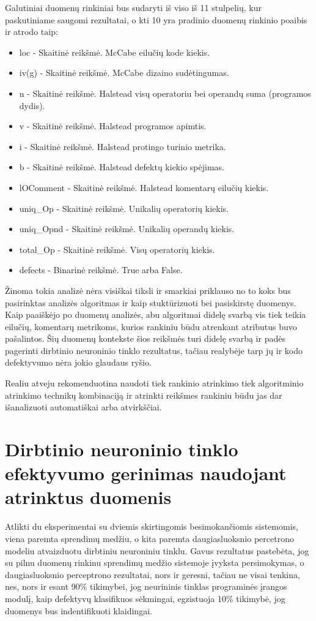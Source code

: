 \documentclass{VUMIFPSbakalaurinis}
\begin{document}
Galutiniai duomenų rinkiniai bus sudaryti iš viso iš 11 stulpelių, kur paskutiniame saugomi rezultatai, o kti 10 yra pradinio duomenų rinkinio poaibis ir atrodo taip:
\begin{itemize} 
\item[] loc - Skaitinė reikšmė. McCabe eilučių kode kiekis.
\item[] iv(g) - Skaitinė reikšmė. McCabe dizaino sudėtingumas.
\item[] n - Skaitinė reikšmė. Halstead visų operatoriu bei operandų suma (programos dydis).
\item[] v - Skaitinė reikšmė. Halstead programos apimtis.
\item[] i - Skaitinė reikšmė. Halstead protingo turinio metrika.
\item[] b - Skaitinė reikšmė. Halstead defektų kiekio spėjimas.
\item[] lOComment - Skaitinė reikšmė. Halstead komentarų eilučių kiekis.
\item[] uniq\_Op - Skaitinė reikšmė. Unikalių operatorių kiekis.
\item[] uniq\_Opnd - Skaitinė reikšmė. Unikalių operandų kiekis.
\item[] total\_Op - Skaitinė reikšmė. Visų operatorių kiekis.
\item[] defects - Binarinė reikšmė. True arba False.
\end{itemize}

Žinoma tokia analizė nėra visiškai tiksli ir smarkiai priklauso no to koks bus pasirinktas analizės algoritmas ir kaip stuktūrizuoti bei pasiskirstę duomenys. Kaip paaiškėjo po duomenų analizės, abu algoritmai didelę svarbą vis tiek teikia eilučių, komentarų metrikoms, kurios rankiniu būdu atrenkant atributus buvo pašalintos. Šių duomenų kontekste šios reikšmės turi didelę svarbą ir padės pagerinti dirbtinio neuroninio tinklo rezultatus, tačiau realybėje tarp jų ir kodo defektyvumo nėra jokio glaudaus ryšio.

Realiu atveju rekomenduotina naudoti tiek rankinio atrinkimo tiek algoritminio atrinkimo technikų kombinaciją ir atrinkti reikšmes rankiniu būdu jas dar išanalizuoti automatiškai arba atvirkščiai.

\section{Dirbtinio neuroninio tinklo efektyvumo gerinimas naudojant atrinktus duomenis}

Atlikti du eksperimentai su dviemis skirtingomis besimokančiomis sistemomis, viena paremta sprendimų medžiu, o kita paremta daugiasluoksnio percetrono modeliu atvaizduotu dirbtiniu neuroniniu tinklu. Gavus rezultatus pastebėta, jog su pilnu duomenų rinkinu sprendimų medžio sistemoje įvyksta persimokymas, o daugiasluoksnio perceptrono rezultatai, nors ir geresni, tačiau ne visai tenkina, nes, nors ir esant 90\% tikimybei, jog neurininis tinklas programinės įrangos modulį, kaip defektyvų klasifikuos sėkmingai, egzistuoja 10\% tikimybė, jog duomenys bus indentifikuoti klaidingai.
\end{document}
